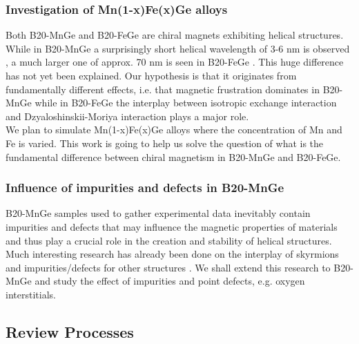 \documentclass [a4paper, 12pt]{article}
\begin{document}
\subsubsection{Investigation of Mn(1-x)Fe(x)Ge alloys}
Both B20-MnGe and B20-FeGe are chiral magnets exhibiting helical structures. While in
B20-MnGe a surprisingly short helical wavelength of 3-6 nm is observed \cite{tanigaki_real-space_2015},
a much larger one of
approx. 70 nm is seen in B20-FeGe \cite{lebech_magnetic_1989}. This huge difference has not yet been explained.
Our hypothesis is that it originates from fundamentally different effects, i.e. that
magnetic frustration dominates in B20-MnGe while in B20-FeGe the interplay between
isotropic exchange interaction and Dzyaloshinskii-Moriya interaction plays a major role.
\\
We plan to
simulate Mn(1-x)Fe(x)Ge alloys where the concentration of Mn and Fe is varied.
This work is going to help us solve the question of what is the fundamental difference between chiral magnetism
in B20-MnGe and B20-FeGe.

\subsubsection{Influence of impurities and defects in B20-MnGe}
B20-MnGe samples used to gather experimental data inevitably contain impurities and defects 
that may influence the magnetic properties of materials and thus play a crucial role
in the creation and stability of helical structures.
Much interesting research has already been done on the interplay of
skyrmions and impurities/defects for other structures
\cite{fert_skyrmions_2013,woo_observation_2016,jiang_direct_2016,crum_perpendicular_2015}.
We shall extend this research to B20-MnGe and
study the effect of impurities and point defects, e.g. oxygen interstitials.

\subsection{Review Processes}
\end{document}
